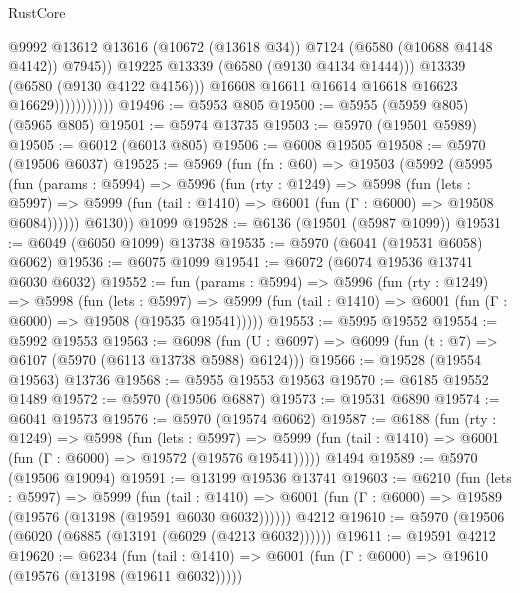 \begin{lexlean}{RustCore}
\begin{coremodule}
                                  @9992
                                  @13612
                                  @13616
                                  (@10672 (@13618 @34))
                                  @7124
                                  (@6580 (@10688 @4148 @4142))
                                  @7945))
                              @19225
                              @13339
                              (@6580 (@9130 @4134 @1444)))
                            @13339
                            (@6580 (@9130 @4122 @4156)))
                          @16608
                          @16611
                          @16614
                          @16618
                          @16623
                          @16629)))))))))))
@19496 := @5953 @805
@19500 := @5955 (@5959 @805) (@5965 @805)
@19501 := @5974 @13735
@19503 := @5970 (@19501 @5989)
@19505 := @6012 (@6013 @805)
@19506 := @6008 @19505
@19508 := @5970 (@19506 @6037)
@19525 := @5969
    (fun (fn : @60) =>
    @19503
      (@5992
        (@5995
          (fun (params : @5994) =>
          @5996
            (fun (rty : @1249) =>
            @5998
              (fun (lets : @5997) =>
              @5999 (fun (tail : @1410) => @6001 (fun (Γ : @6000) => @19508 @6084))))))
        @6130))
    @1099
@19528 := @6136 (@19501 (@5987 @1099))
@19531 := @6049 (@6050 @1099) @13738
@19535 := @5970 (@6041 (@19531 @6058) @6062)
@19536 := @6075 @1099
@19541 := @6072 (@6074 @19536 @13741 @6030 @6032)
@19552 := fun (params : @5994) =>
  @5996
    (fun (rty : @1249) =>
    @5998
      (fun (lets : @5997) =>
      @5999 (fun (tail : @1410) => @6001 (fun (Γ : @6000) => @19508 (@19535 @19541)))))
@19553 := @5995 @19552
@19554 := @5992 @19553
@19563 := @6098
    (fun (U : @6097) => @6099 (fun (t : @7) => @6107 (@5970 (@6113 @13738 @5988) @6124)))
@19566 := @19528 (@19554 @19563) @13736
@19568 := @5955 @19553 @19563
@19570 := @6185 @19552 @1489
@19572 := @5970 (@19506 @6887)
@19573 := @19531 @6890
@19574 := @6041 @19573
@19576 := @5970 (@19574 @6062)
@19587 := @6188
    (fun (rty : @1249) =>
    @5998
      (fun (lets : @5997) =>
      @5999 (fun (tail : @1410) => @6001 (fun (Γ : @6000) => @19572 (@19576 @19541)))))
    @1494
@19589 := @5970 (@19506 @19094)
@19591 := @13199 @19536 @13741
@19603 := @6210
    (fun (lets : @5997) =>
    @5999
      (fun (tail : @1410) =>
      @6001 (fun (Γ : @6000) => @19589 (@19576 (@13198 (@19591 @6030 @6032))))))
    @4212
@19610 := @5970 (@19506 (@6020 (@6885 (@13191 (@6029 (@4213 @6032))))))
@19611 := @19591 @4212
@19620 := @6234
    (fun (tail : @1410) => @6001 (fun (Γ : @6000) => @19610 (@19576 (@13198 (@19611 @6032)))))

\end{coremodule}
\end{lexlean}
